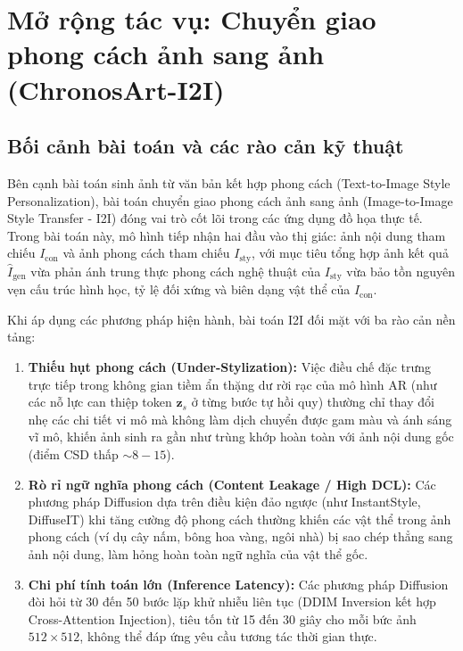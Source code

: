 \documentclass[10pt,twocolumn,letterpaper]{article}
\begin{document}
\section{Mở rộng tác vụ: Chuyển giao phong cách ảnh sang ảnh (ChronosArt-I2I)}
\label{sec:i2i}

\subsection{Bối cảnh bài toán và các rào cản kỹ thuật}
Bên cạnh bài toán sinh ảnh từ văn bản kết hợp phong cách (Text-to-Image Style Personalization), bài toán chuyển giao phong cách ảnh sang ảnh (Image-to-Image Style Transfer - I2I) đóng vai trò cốt lõi trong các ứng dụng đồ họa thực tế. Trong bài toán này, mô hình tiếp nhận hai đầu vào thị giác: ảnh nội dung tham chiếu $I_{\text{con}}$ và ảnh phong cách tham chiếu $I_{\text{sty}}$, với mục tiêu tổng hợp ảnh kết quả $\hat{I}_{\text{gen}}$ vừa phản ánh trung thực phong cách nghệ thuật của $I_{\text{sty}}$ vừa bảo tồn nguyên vẹn cấu trúc hình học, tỷ lệ đối xứng và biên dạng vật thể của $I_{\text{con}}$.

Khi áp dụng các phương pháp hiện hành, bài toán I2I đối mặt với ba rào cản nền tảng:
\begin{enumerate}
    \item \textbf{Thiếu hụt phong cách (Under-Stylization):} Việc điều chế đặc trưng trực tiếp trong không gian tiềm ẩn thặng dư rời rạc của mô hình AR (như các nỗ lực can thiệp token $\mathbf{z}_s$ ở từng bước tự hồi quy) thường chỉ thay đổi nhẹ các chi tiết vi mô mà không làm dịch chuyển được gam màu và ánh sáng vĩ mô, khiến ảnh sinh ra gần như trùng khớp hoàn toàn với ảnh nội dung gốc (điểm CSD thấp $\sim 8 - 15$).
    \item \textbf{Rò rỉ ngữ nghĩa phong cách (Content Leakage / High DCL):} Các phương pháp Diffusion dựa trên điều kiện đảo ngược (như InstantStyle, DiffuseIT) khi tăng cường độ phong cách thường khiến các vật thể trong ảnh phong cách (ví dụ cây nấm, bông hoa vàng, ngôi nhà) bị sao chép thẳng sang ảnh nội dung, làm hỏng hoàn toàn ngữ nghĩa của vật thể gốc.
    \item \textbf{Chi phí tính toán lớn (Inference Latency):} Các phương pháp Diffusion đòi hỏi từ 30 đến 50 bước lặp khử nhiễu liên tục (DDIM Inversion kết hợp Cross-Attention Injection), tiêu tốn từ 15 đến 30 giây cho mỗi bức ảnh $512 \times 512$, không thể đáp ứng yêu cầu tương tác thời gian thực.
\end{enumerate}
\end{document}
